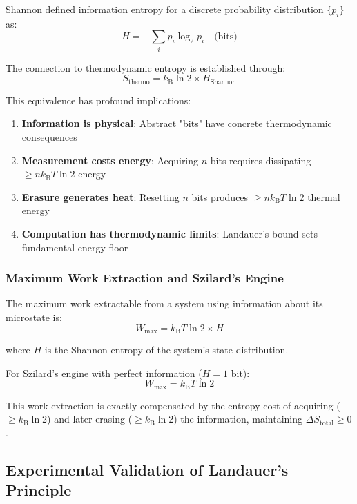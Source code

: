 \documentclass[11pt,a4paper]{article}
\newcommand{\kB}{k_\text{B}}
\begin{document}
Shannon defined information entropy for a discrete probability distribution $\{p_i\}$ as\cite{shannon1948mathematical}:
\begin{equation}
H = -\sum_i p_i \log_2 p_i \quad \text{(bits)}
\end{equation}

The connection to thermodynamic entropy is established through:
\begin{equation}
S_{\text{thermo}} = \kB \ln 2 \times H_{\text{Shannon}}
\end{equation}

This equivalence has profound implications:
\begin{enumerate}
\item \textbf{Information is physical}: Abstract "bits" have concrete thermodynamic consequences
\item \textbf{Measurement costs energy}: Acquiring $n$ bits requires dissipating $\geq n \kB T \ln 2$ energy
\item \textbf{Erasure generates heat}: Resetting $n$ bits produces $\geq n \kB T \ln 2$ thermal energy
\item \textbf{Computation has thermodynamic limits}: Landauer's bound sets fundamental energy floor
\end{enumerate}

\subsubsection{Maximum Work Extraction and Szilard's Engine}

The maximum work extractable from a system using information about its microstate is:
\begin{equation}
W_{\text{max}} = \kB T \ln 2 \times H
\end{equation}

where $H$ is the Shannon entropy of the system's state distribution.

For Szilard's engine with perfect information ($H = 1$ bit):
\begin{equation}
W_{\text{max}} = \kB T \ln 2
\end{equation}

This work extraction is exactly compensated by the entropy cost of acquiring ($\geq \kB \ln 2$) and later erasing ($\geq \kB \ln 2$) the information, maintaining $\Delta S_{\text{total}} \geq 0$.

\subsection{Experimental Validation of Landauer's Principle}
\end{document}
